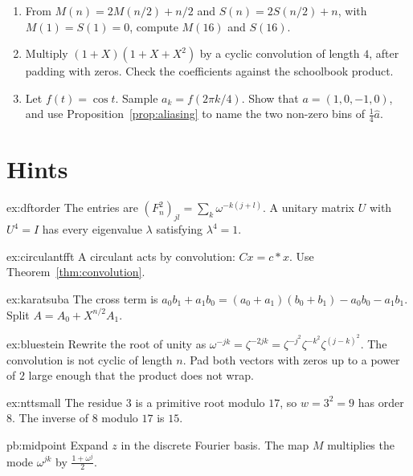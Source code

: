 \begin{exercise}[$\star\star\star$]\label{ex:rw07d}
\begin{enumerate}[label=(\alph*)]
\item From $M(n)=2M(n/2)+n/2$ and $S(n)=2S(n/2)+n$, with $M(1)=S(1)=0$, compute $M(16)$ and $S(16)$.
\item Multiply $(1+X)(1+X+X^2)$ by a cyclic convolution of length $4$, after padding with zeros. Check the coefficients against the schoolbook product.
\item Let $f(t)=\cos t$. Sample $a_k=f(2\pi k/4)$. Show that $a=(1,0,-1,0)$, and use Proposition~\ref{prop:aliasing} to name the two non-zero bins of $\frac14\hat a$.
\end{enumerate}
\end{exercise}

\section{Hints}

\begin{hint}{ex:dftorder}
The entries are $(F_n^2)_{jl}=\sum_k\omega^{-k(j+l)}$. A unitary matrix $U$ with $U^4=I$ has every eigenvalue $\lambda$ satisfying $\lambda^4=1$.
\end{hint}
\begin{hint}{ex:circulantfft}
A circulant acts by convolution: $Cx=c*x$. Use Theorem~\ref{thm:convolution}.
\end{hint}
\begin{hint}{ex:karatsuba}
The cross term is $a_0b_1+a_1b_0=(a_0+a_1)(b_0+b_1)-a_0b_0-a_1b_1$. Split $A=A_0+X^{n/2}A_1$.
\end{hint}
\begin{hint}{ex:bluestein}
Rewrite the root of unity as $\omega^{-jk}=\zeta^{-2jk}=\zeta^{-j^2}\zeta^{-k^2}\zeta^{(j-k)^2}$. The convolution is not cyclic of length $n$. Pad both vectors with zeros up to a power of $2$ large enough that the product does not wrap.
\end{hint}
\begin{hint}{ex:nttsmall}
The residue $3$ is a primitive root modulo $17$, so $w=3^2=9$ has order $8$. The inverse of $8$ modulo $17$ is $15$.
\end{hint}

\begin{hint}{pb:midpoint}
Expand $z$ in the discrete Fourier basis. The map $M$ multiplies the mode $\omega^{jk}$ by $\frac{1+\omega^j}2$.
\end{hint}

